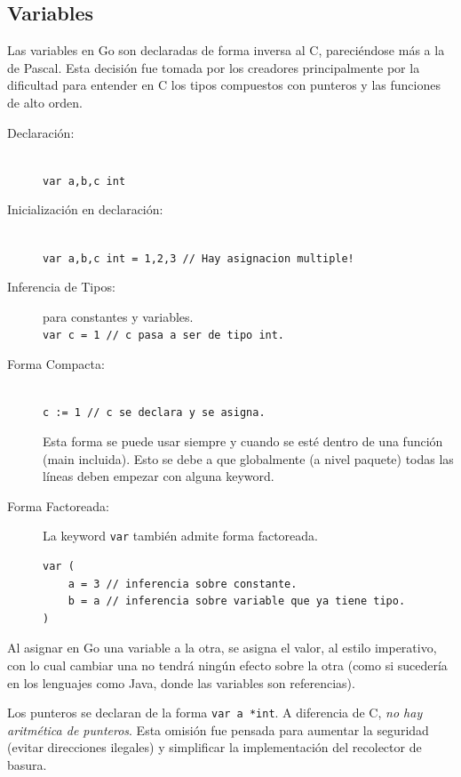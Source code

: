 \documentclass{article}
\begin{document}
\subsection{Variables}
Las variables en Go son declaradas de forma inversa al C, pareciéndose más a la de Pascal. Esta decisión fue tomada por los creadores principalmente por la dificultad para entender en C los tipos compuestos con punteros y las funciones de alto orden\cite{dec}.
\begin{description}
	\item[Declaración:]\hfill \\
		\lstinline|var a,b,c int|
	\item[Inicialización en declaración:] \hfill \\
		\lstinline|var a,b,c int = 1,2,3 // Hay asignacion multiple!|
	\item[Inferencia de Tipos:] para constantes y variables. \\
		\lstinline|var c = 1 // c pasa a ser de tipo int.|
	\item[Forma Compacta:] \hfill \\
		\lstinline|c := 1 // c se declara y se asigna.|
	
	Esta forma se puede usar siempre y cuando se esté dentro de una función (main incluida). Esto se debe a que globalmente (a nivel paquete) todas las líneas deben empezar con alguna keyword. 
	\item[Forma Factoreada:] La keyword \lstinline|var| también admite forma factoreada.
\begin{lstlisting}
var (
	a = 3 // inferencia sobre constante.
	b = a // inferencia sobre variable que ya tiene tipo.
)
\end{lstlisting}
\end{description}

Al asignar en Go una variable a la otra, se asigna el valor, al estilo imperativo, con lo cual cambiar una no tendrá ningún efecto sobre la otra (como si sucedería en los lenguajes como Java, donde las variables son referencias).

Los punteros se declaran de la forma \lstinline|var a *int|. A diferencia de C, \emph{no hay aritmética de punteros}. Esta omisión fue pensada para aumentar la seguridad (evitar direcciones ilegales) y simplificar la implementación del recolector de basura.\cite{pa}
\end{document}
